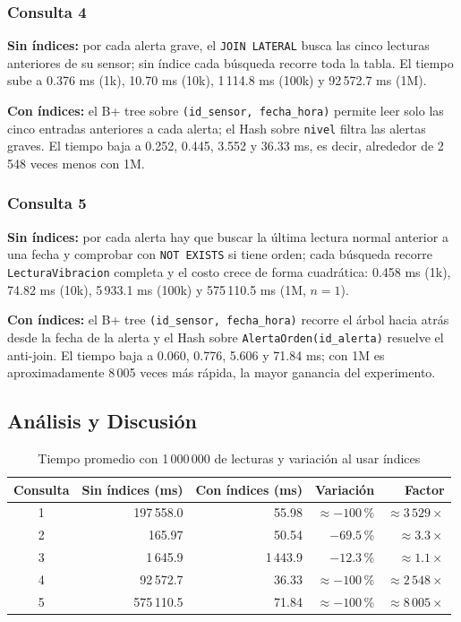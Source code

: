 \subsubsection{Consulta 4}

\textbf{Sin índices:} por cada alerta grave, el \texttt{JOIN LATERAL} busca las
cinco lecturas anteriores de su sensor; sin índice cada búsqueda recorre toda
la tabla. El tiempo sube a 0.376 ms (1k), 10.70 ms (10k), 1\,114.8 ms (100k) y
92\,572.7 ms (1M).

\textbf{Con índices:} el B+ tree sobre \texttt{(id\_sensor, fecha\_hora)}
permite leer solo las cinco entradas anteriores a cada alerta; el Hash sobre
\texttt{nivel} filtra las alertas graves. El tiempo baja a 0.252, 0.445,
3.552 y 36.33 ms, es decir, alrededor de 2\,548 veces menos con 1M.


\subsubsection{Consulta 5}

\textbf{Sin índices:} por cada alerta hay que buscar la última lectura normal
anterior a una fecha y comprobar con \texttt{NOT EXISTS} si tiene orden; cada
búsqueda recorre \texttt{LecturaVibracion} completa y el costo crece de forma
cuadrática: 0.458 ms (1k), 74.82 ms (10k), 5\,933.1 ms (100k) y 575\,110.5 ms
(1M, $n=1$).

\textbf{Con índices:} el B+ tree \texttt{(id\_sensor, fecha\_hora)} recorre el
árbol hacia atrás desde la fecha de la alerta y el Hash sobre
\texttt{AlertaOrden(id\_alerta)} resuelve el anti-join. El tiempo baja a
0.060, 0.776, 5.606 y 71.84 ms; con 1M es aproximadamente 8\,005 veces más
rápida, la mayor ganancia del experimento.



\subsection{Análisis y Discusión}


\begin{table}[H]
\centering
\small
\caption{Tiempo promedio con 1\,000\,000 de lecturas y variación al usar índices}
\begin{tabular}{|c|r|r|r|r|}
\hline
\textbf{Consulta} & \textbf{Sin índices (ms)} & \textbf{Con índices (ms)} & \textbf{Variación} & \textbf{Factor} \\ \hline
1 & 197\,558.0 & 55.98 & $\approx-100$\,\% & $\approx3\,529\times$ \\ \hline
2 & 165.97 & 50.54 & $-69.5$\,\% & $\approx3.3\times$ \\ \hline
3 & 1\,645.9 & 1\,443.9 & $-12.3$\,\% & $\approx1.1\times$ \\ \hline
4 & 92\,572.7 & 36.33 & $\approx-100$\,\% & $\approx2\,548\times$ \\ \hline
5 & 575\,110.5 & 71.84 & $\approx-100$\,\% & $\approx8\,005\times$ \\ \hline
\end{tabular}
\end{table}


